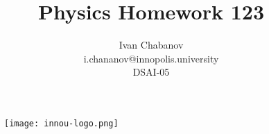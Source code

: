 \begin{titlepage}

    \begin{figure}[t]
        \centering
        \texttt{[image: innou-logo.png]} %
    \end{figure}
    
    \title{Physics Homework 123}
    \author{Ivan Chabanov\\i.chananov@innopolis.university\\DSAI-05}

    \maketitle

\end{titlepage}